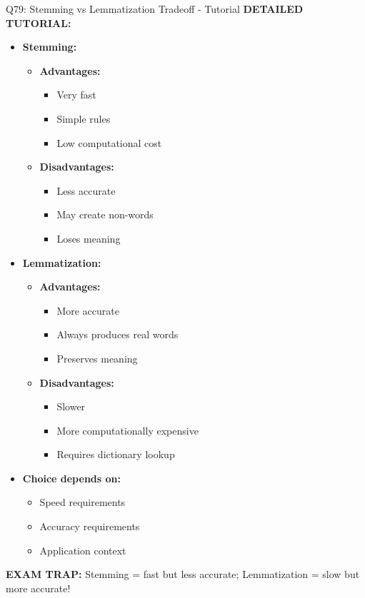 \documentclass[8pt]{beamer}
\begin{document}
\begin{frame}{Q79: Stemming vs Lemmatization Tradeoff - Tutorial}
		\vspace{0.1cm}
		\textbf{DETAILED TUTORIAL:}
		\begin{itemize}
			\item \textbf{Stemming:}
			\begin{itemize}
				\item \textbf{Advantages:}
				\begin{itemize}
					\item Very fast
					\item Simple rules
					\item Low computational cost
				\end{itemize}
				\item \textbf{Disadvantages:}
				\begin{itemize}
					\item Less accurate
					\item May create non-words
					\item Loses meaning
				\end{itemize}
			\end{itemize}
			\item \textbf{Lemmatization:}
			\begin{itemize}
				\item \textbf{Advantages:}
				\begin{itemize}
					\item More accurate
					\item Always produces real words
					\item Preserves meaning
				\end{itemize}
				\item \textbf{Disadvantages:}
				\begin{itemize}
					\item Slower
					\item More computationally expensive
					\item Requires dictionary lookup
				\end{itemize}
			\end{itemize}
			\item \textbf{Choice depends on:}
			\begin{itemize}
				\item Speed requirements
				\item Accuracy requirements
				\item Application context
			\end{itemize}
		\end{itemize}
		
		\textcolor{myred}{\textbf{EXAM TRAP:}} Stemming = \textcolor{myblue}{fast but less accurate}; Lemmatization = \textcolor{myblue}{slow but more accurate}!
	\end{frame}
	
\end{document}
